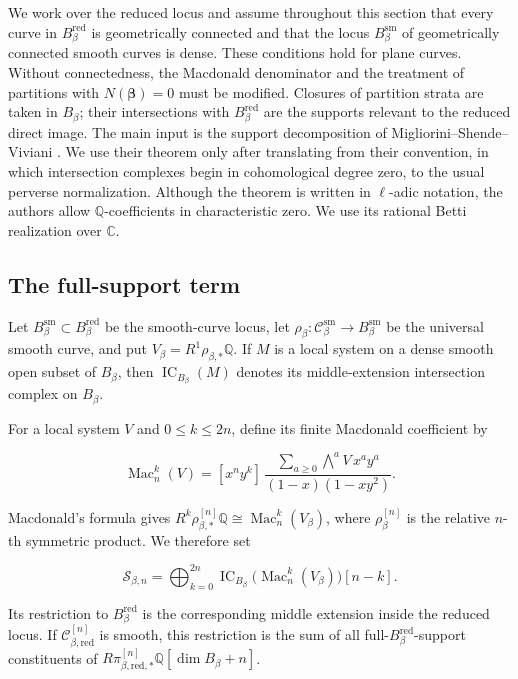 \documentclass[11pt,reqno]{amsart}
\theoremstyle{definition}
\newcommand{\C}{\mathbb C}
\newcommand{\Q}{\mathbb Q}
\newcommand{\IC}{\operatorname{IC}}
\newcommand{\red}{\mathrm{red}}
\newcommand{\sm}{\mathrm{sm}}
\newcommand{\Mac}{\operatorname{Mac}}
\begin{document}
We work over the reduced locus and assume throughout this section that
every curve in $B_\beta^{\red}$ is geometrically connected and that the locus
$B_\beta^{\sm}$ of geometrically connected smooth curves is dense.  These
conditions hold for plane curves.  Without connectedness, the Macdonald
denominator and the treatment of partitions with $N(\boldsymbol\beta)=0$
must be modified.  Closures of partition strata are taken in $B_\beta$;
their intersections with $B_\beta^{\red}$ are the supports relevant to the
reduced direct image.  The main input is the support decomposition of
Migliorini--Shende--Viviani \cite[Theorem~5.10]{MSV}.  We use their theorem
only after translating from their convention, in which intersection complexes
begin in cohomological degree zero, to the usual perverse normalization.
Although the theorem is written in $\ell$-adic notation, the authors allow
$\Q$-coefficients in characteristic zero.  We use its rational Betti
realization over $\C$.

\subsection{The full-support term}

Let $B_\beta^{\sm}\subset B_\beta^{\red}$ be the smooth-curve locus,
let $\rho_\beta:\mathcal C_\beta^{\sm}\to B_\beta^{\sm}$ be the universal
smooth curve, and put $V_\beta=R^1\rho_{\beta,*}\Q$.
If $M$ is a local system on a dense smooth open subset of $B_\beta$, then
$\IC_{B_\beta}(M)$ denotes its middle-extension intersection complex on
$B_\beta$.

For a local system $V$ and $0\le k\le2n$, define its finite Macdonald
coefficient by

\begin{equation}\label{eq:finite-macdonald}
  \Mac_n^k(V)
  =[x^ny^k]\,
  \frac{\sum_{a\ge0}\bigwedge^aV\,x^ay^a}
       {(1-x)(1-xy^2)}.
\end{equation}

Macdonald's formula \cite{Macdonald} gives
$R^k\rho_{\beta,*}^{[n]}\Q\cong\Mac_n^k(V_\beta)$, where
$\rho_\beta^{[n]}$ is the relative $n$-th symmetric product.
We therefore set

\begin{equation}\label{eq:smooth-support}
  \mathcal S_{\beta,n}
  =\bigoplus_{k=0}^{2n}
  \IC_{B_\beta}
  \bigl(\Mac_n^k(V_\beta)\bigr)[n-k].
\end{equation}

Its restriction to $B_\beta^{\red}$ is the corresponding middle extension
inside the reduced locus.  If $\mathcal C_{\beta,\red}^{[n]}$ is smooth,
this restriction is the sum of all full-$B_\beta^{\red}$-support
constituents of
$R\pi_{\beta,\red,*}^{[n]}\Q[\dim B_\beta+n]$.
\end{document}
